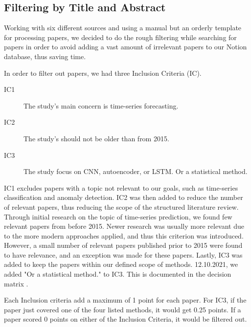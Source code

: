 \subsection{Filtering by Title and Abstract}
Working with six different sources and using a manual but an orderly template for processing papers,
we decided to do the rough filtering while searching for papers in order to avoid adding a vast amount of irrelevant
papers to our Notion database, thus saving time.

In order to filter out papers, we had three Inclusion Criteria (IC).
\begin{description}
  \item[IC1] The study's main concern is time-series forecasting.
  \item[IC2] The study's should not be older than from 2015.
  \item[IC3] The study focus on CNN, autoencoder, or LSTM. Or a statistical method.
\end{description}
IC1 excludes papers with a topic not relevant to our goals, such as time-series classification and anomaly detection.
IC2 was then added to reduce the number of relevant papers, thus reducing the scope of the structured literature review.
Through initial research on the topic of time-series prediction, we found few relevant papers from before 2015.
Newer research was usually more relevant due to the more modern approaches applied, and thus this criterion was introduced.
However, a small number of relevant papers published prior to 2015 were found to have relevance, and an exception was made for these papers.
Lastly, IC3 was added to keep the papers within our defined scope of methods. 12.10.2021, we added "Or a statistical method."
to IC3. This is documented in the decision matrix \citep{decisionmatrix}.

Each Inclusion criteria add a maximum of 1 point for each paper. For IC3, if the paper just covered one of the
four listed methods, it would get 0.25 points. If a paper scored 0 points on either of the Inclusion Criteria, it would be filtered out.

